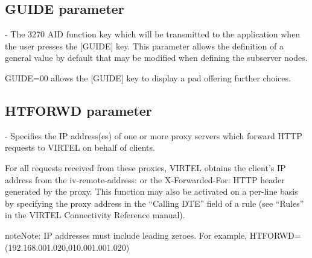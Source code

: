 \documentclass[letterpaper,10pt,english]{sphinxmanual}
\begin{document}

\subsection{GUIDE parameter}
\label{\detokenize{Installation_Guide:index-74}}\label{\detokenize{Installation_Guide:guide-parameter}}
\begin{sphinxVerbatim}[commandchars=\\\{\}]
                  
\end{sphinxVerbatim}

 - The 3270 AID function key which will be transmitted to the application when the user presses the {[}GUIDE{]} key. This parameter allows the definition of a general value by default that may be modified when defining the subserver nodes.

GUIDE=00 allows the {[}GUIDE{]} key to display a pad offering further choices.


\subsection{HTFORWD parameter}
\label{\detokenize{Installation_Guide:index-75}}\label{\detokenize{Installation_Guide:htforwd-parameter}}
\begin{sphinxVerbatim}[commandchars=\\\{\}]
        
\end{sphinxVerbatim}

 - Specifies the IP address(es) of one or more proxy servers which forward HTTP requests to VIRTEL on behalf of clients.

For all requests received from these proxies, VIRTEL obtains the client’s IP address from the iv-remote-address: or the X-Forwarded-For: HTTP header generated by the proxy. This function may also be activated on a per-line basis by specifying the proxy address in the “Calling DTE” field of a rule (see “Rules” in the VIRTEL Connectivity Reference manual).

\begin{sphinxadmonition}{note}{Note:}
IP addresses must include leading zeroes. For example, HTFORWD=(192.168.001.020,010.001.001.020)
\end{sphinxadmonition}
\end{document}
